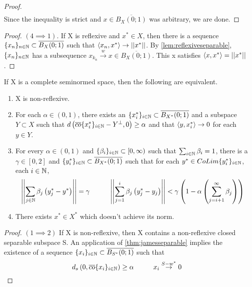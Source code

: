\begin{thm}
\begin{proof}
\begin{equation}
\begin{split}
            \end{split}
        \end{equation}
        Since the inequality is strict and $x \in \overline{B_X(0;1)}$ was arbitrary, we are done. 
    \end{proof} 
    \begin{proof} $(4 \implies 1)$. 
        If X is reflexive and $x^* \in X$, then there is a sequence $\{x_n\}_{n \in \N} \subset \overline{B_X(0;1)}$ such that $\ip{x_n,x^*} \to \norm{x^*}$.  By  \ref{lem:reflexiveseparable}, $\{x_n\}_{n \in \N}$ has a subsequence $x_{k_n} \overset{w}{\to} x \in \overline{B_X(0;1)}$. This x satisfies $\ip{x,x^*} = \norm{x^*}$. 
    \end{proof} 
\end{thm} 

\begin{thm}[James]
    \label{thm:james}
    If X is a complete seminormed space, then the following are equivalent. 
    \begin{enumerate}
        \item X is non-reflexive. 
        \item For each $\alpha \in (0,1)$, there exists an $\{x_i^*\}_{i \in \N} \subset \overline{B_{X^*}(0;1)}$ and a subspace $Y \subset X$ such that $d\pa{ \overline{co}\{x_i^*\}_{i \in \N}-Y^{\perp},0} \geq \alpha$ and that $\ip{y,x_i^*} \to 0$ for each $y \in Y$.
        \item For every $\alpha \in (0,1)$ and $\{\beta_i\}_{i \in \N} \subset [0,\infty)$ such that $\sum_{i \in \N} \beta_i = 1$, there is a $\gamma \in [0,2]$ and  $\{y_i^*\}_{i \in \N} \subset \overline{B_{X^*}(0;1)}$ such that for each $y^* \in CoLim\{y_i^*\}_{i \in \N}$, each $i \in \N$, 
        \begin{equation} 
            \norm{\sum_{j \in \N} \beta_j \pa{ y_j^*-y^*}} = \gamma \tab[1cm] \norm{\sum_{j=1}^i \beta_j \pa{ y_j^*-y_j}} < \gamma \pa{1-\alpha \pa{ \sum_{j=i+1}^{\infty} \beta_j}}
        \end{equation}
        \item There exists $x^* \in X^*$ which doesn't achieve its norm.  
    \end{enumerate}
    \begin{proof} $(1 \implies 2)$
        If X is non-reflexive, then X contains a non-reflexive closed separable subspace S. An application of \ref{thm:jamesseparable} implies the existence of a sequence $\{x_i\}_{i \in \N} \subset \overline{B_{S^*}(0;1)}$ such that 
        \begin{equation}
            d_s\pa{0,\overline{co}\{x_i\}_{i \in \N}} \geq \alpha \tab[1cm] x_i \overset{S-w^*}{\to} 0
        \end{equation}
        

\end{proof}
\end{thm}

